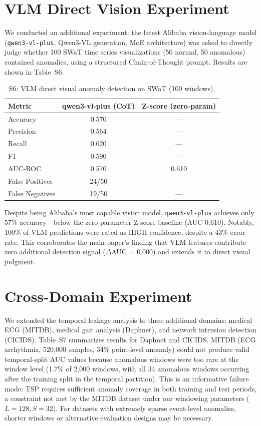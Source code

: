 \documentclass[12pt]{article}
\begin{document}
\section{VLM Direct Vision Experiment}

We conducted an additional experiment: the latest Alibaba vision-language model (\texttt{qwen3-vl-plus}, Qwen3-VL generation, MoE architecture) was asked to directly judge whether 100 SWaT time series visualizations (50 normal, 50 anomalous) contained anomalies, using a structured Chain-of-Thought prompt. Results are shown in Table~S6.

\begin{table}[htbp]
\centering
\caption{S6: VLM direct visual anomaly detection on SWaT (100 windows).}
\begin{tabular}{lcc}
\toprule
Metric & qwen3-vl-plus (CoT) & Z-score (zero-param) \\
\midrule
Accuracy  & 0.570 & --- \\
Precision & 0.564 & --- \\
Recall    & 0.620 & --- \\
F1        & 0.590 & --- \\
AUC-ROC   & 0.570 & 0.610 \\
False Positives & 24/50 & --- \\
False Negatives & 19/50 & --- \\
\bottomrule
\end{tabular}
\end{table}

Despite being Alibaba's most capable vision model, \texttt{qwen3-vl-plus} achieves only 57\% accuracy---below the zero-parameter Z-score baseline (AUC 0.610). Notably, 100\% of VLM predictions were rated as HIGH confidence, despite a 43\% error rate. This corroborates the main paper's finding that VLM features contribute zero additional detection signal ($\Delta$AUC = 0.000) and extends it to direct visual judgment.

\section{Cross-Domain Experiment}

We extended the temporal leakage analysis to three additional domains: medical ECG (MITDB), medical gait analysis (Daphnet), and network intrusion detection (CICIDS). Table~S7 summarizes results for Daphnet and CICIDS. MITDB (ECG arrhythmia, 520,000 samples, 34\% point-level anomaly) could not produce valid temporal-split AUC values because anomalous windows were too rare at the window level (1.7\% of 2,000 windows, with all 34 anomalous windows occurring after the training split in the temporal partition). This is an informative failure mode: TSP requires sufficient anomaly coverage in both training and test periods, a constraint not met by the MITDB dataset under our windowing parameters ($L=128, S=32$). For datasets with extremely sparse event-level anomalies, shorter windows or alternative evaluation designs may be necessary.
\end{document}
